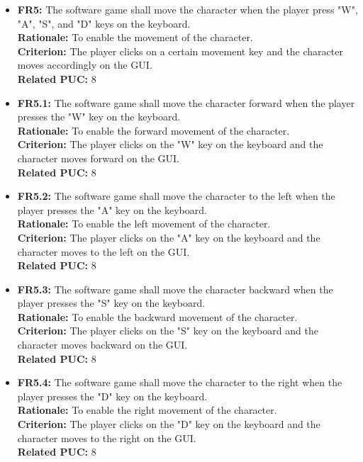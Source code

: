 \documentclass[12pt, titlepage]{article}
\begin{document}
\begin{itemize}
        \item \textbf{FR5:} The software game shall move the character when the player press "W", "A", "S", and "D" keys on the keyboard.\\
        \textbf{Rationale:} To enable the movement of the character.\\
        \textbf{Criterion:} The player clicks on a certain movement key and the character moves accordingly on the GUI.\\
        \textbf{Related PUC:} 8
        
        \item \textbf{FR5.1:} The software game shall move the character forward when the player presses the "W" key on the keyboard.\\
        \textbf{Rationale:} To enable the forward movement of the character.\\
        \textbf{Criterion:} The player clicks on the "W" key on the keyboard and the character moves forward on the GUI.\\
        \textbf{Related PUC:} 8
        
        \item \textbf{FR5.2:} The software game shall move the character to the left when the player presses the "A" key on the keyboard.\\
        \textbf{Rationale:} To enable the left movement of the character.\\
        \textbf{Criterion:} The player clicks on the "A" key on the keyboard and the character moves to the left on the GUI.\\
        \textbf{Related PUC:} 8
        
        \item \textbf{FR5.3:} The software game shall move the character backward when the player presses the "S" key on the keyboard.\\
        \textbf{Rationale:} To enable the backward movement of the character.\\
        \textbf{Criterion:} The player clicks on the "S" key on the keyboard and the character moves backward on the GUI.\\
        \textbf{Related PUC:} 8
        
        \item \textbf{FR5.4:} The software game shall move the character to the right when the player presses the "D" key on the keyboard.\\
        \textbf{Rationale:} To enable the right movement of the character.\\
        \textbf{Criterion:} The player clicks on the "D" key on the keyboard and the character moves to the right on the GUI.\\
        \textbf{Related PUC:} 8
        

\end{itemize}
\end{document}
